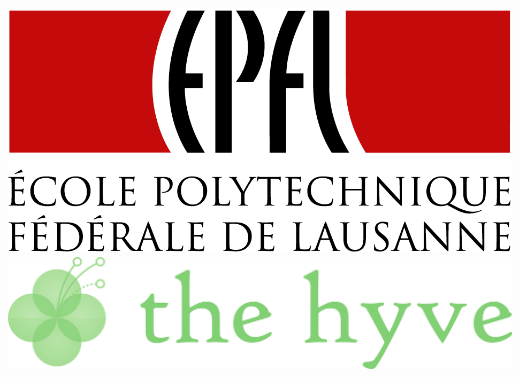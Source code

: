\begin{titlepage}
\includegraphics[width=0.55\linewidth]{./figures/epfl_logo.png}\\[0.5cm]
\includegraphics[width=0.70\linewidth]{./figures/thehyve_logo.png}\\

\vfill

\end{titlepage}
